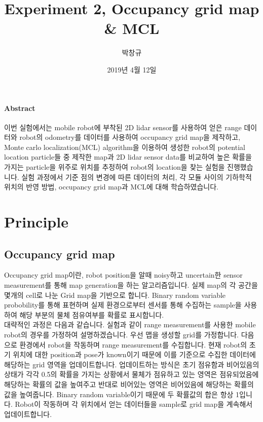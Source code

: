 \documentclass{article}
\title{Experiment 2, Occupancy grid map \& MCL}
\author{박창규}
\date{2019년 4월 12일}
\begin{document}
	\maketitle
	\thispagestyle{empty}
	\newpage
	\paragraph{Abstract}
	이번 실험에서는 mobile robot에 부착된 2D lidar sensor를 사용하여 얻은 range 데이터와 robot의 odometry를 데이터를 사용하여 occupancy grid map을 제작하고, Monte carlo localization(MCL) algorithm을 이용하여 생성한 robot의 potential location particle들 중 제작한 map과 2D lidar sensor data를 비교하여 높은 확률을 가지는 particle을 위주로 위치를 추정하여 robot의 location을 찾는 실험을 진행했습니다. 실험 과정에서 기준 점의 변경에 따른 데이터의 처리, 각 모듈 사이의 기하학적 위치의 반영 방법, occupancy grid map과 MCL에 대해 학습하였습니다.
	\tableofcontents
	\thispagestyle{empty}
	
	\newpage
	\setcounter{page}{1}
		
	\section{Principle}
		\subsection{Occupancy grid map}
		Occupancy grid map이란, robot position을 알때 noisy하고 uncertain한 sensor measurement를 통해 map generation을 하는 알고리즘입니다. 실제 map의 각 공간을 몇개의 cell로 나눈 Grid map을 기반으로 합니다. Binary random variable probobility를 통해 표현하며 실제 환경으로부터 센서를 통해 수집하는 sample을 사용하여 해당 부분의 물체 점유여부를 확률로 표시합니다.\\
		\indent 대략적인 과정은 다음과 같습니다. 실험과 같이 range measurement를 사용한 mobile robot의 경우를 가정하여 설명하겠습니다. 우선 맵을 생성할 grid를 가정합니다. 다음으로 환경에서 robot을 작동하며 range measurement를 수집합니다. 현재 robot의 초기 위치에 대한 position과 pose가 known이기 때문에 이를 기준으로 수집한 데이터에 해당하는 grid 영역을 업데이트합니다. 업데이트하는 방식은 초기 점유함과 비어있음의 상태가 각각 0.5의 확률을 가지는 상황에서 물체가 점유하고 있는 영역은 점유되었음에 해당하는 확률의 값을 높여주고 반대로 비어있는 영역은 비어있음에 해당하는 확률의 값을 높여줍니다. Binary random variable이기 때문에 두 확률값의 합은 항상 1입니다. Robot이 작동하며 각 위치에서 얻는 데이터들을 sample로 grid map을 계속해서 업데이트합니다.
		
\end{document}
